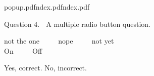 \documentclass[dvips]{article}
\begin{document}
{popup.pdf}{ndex.pdf}{ndex.pdf} %
{Question 4. $\;$ A multiple radio button question.
    \begin{center}
    not the one \radioone{}   $\quad\quad$ %
    nope \radiotwo{}  $\quad\quad$ %
    not yet \radiothree{}  \\ %
    On \radiofour{}  $\quad\quad$ %
    Off \radiofive{}  %
    \end{center}
}
{Yes, correct.} %
{No, incorrect.} %
\end{document}
